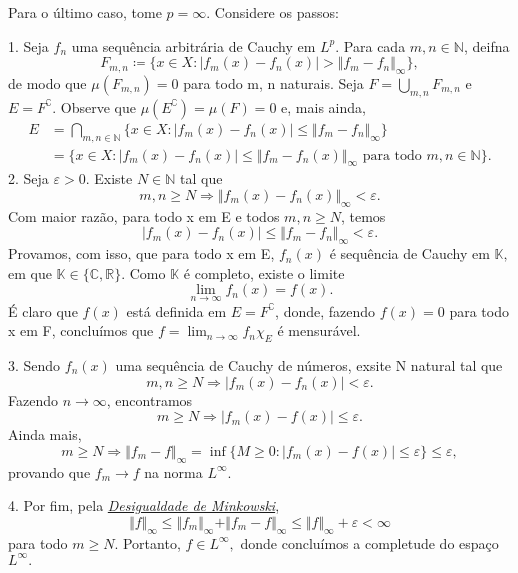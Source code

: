 \documentclass[measure_theory.tex]{subfiles}
\begin{document}
\begin{proof*}
	Para o último caso, tome \(p=\infty\). Considere os passos:

	1. Seja \(f_{n}\) uma sequência arbitrária de Cauchy em \(L^{p}.\) Para cada \(m, n\in \mathbb{N}\), deifna
	\[
		F_{m, n}\coloneqq \{x\in X: |f_{m}(x) - f_{n}(x)| > \Vert f_{m}-f_{n} \Vert_{\infty}\},
	\]
	de modo que \(\mu (F_{m, n})=0\) para todo m, n naturais. Seja \(F = \bigcup_{m, n}^{}F_{m, n}\) e \(E = F ^{\complement}\). Observe que \(\mu (E ^{\complement}) = \mu (F) = 0\) e, mais ainda,
	\begin{align*}
		E & =\bigcap_{m, n\in \mathbb{N}}^{}\{x\in X: |f_{m}(x) - f_{n}(x)| \leq \Vert f_{m}-f_{n} \Vert_{\infty}\}            \\
		  & =\{x\in X: |f_{m}(x) - f_{n}(x)| \leq \Vert f_{m} - f_{n}(x) \Vert_{\infty}\text{ para todo }m, n\in \mathbb{N}\}.
	\end{align*}
	2. Seja \(\varepsilon  > 0\). Existe \(N\in \mathbb{N}\) tal que
	\[
		m, n\geq N \Rightarrow \Vert f_{m}(x) - f_{n}(x) \Vert_{\infty} < \varepsilon .
	\]
	Com maior razão, para todo x em E e todos \(m, n\geq N\), temos
	\[
		|f_{m}(x) - f_{n}(x)|\leq \Vert f_{m} - f_{n} \Vert_{\infty} < \varepsilon .
	\]
	Provamos, com isso, que para todo x em E, \(f_{n}(x)\) é sequência de Cauchy em \(\mathbb{K},\) em que \(\mathbb{K}\in \{\mathbb{C}, \mathbb{R}\}\). Como \(\mathbb{K}\) é completo, existe o limite
	\[
		\lim_{n\to \infty}f_{n}(x) = f(x).
	\]
	É claro que \(f(x)\) está definida em \(E = F ^{\complement}\), donde, fazendo \(f(x) = 0\) para todo x em F, concluímos que \(f = \lim_{n\to \infty}f_{n}\chi_{E}\) é mensurável.

	3. Sendo \(f_{n}(x)\) uma sequência de Cauchy de números, exsite N natural tal que
	\[
		m, n \geq N \Rightarrow |f_{m}(x) - f_{n}(x)| < \varepsilon .
	\]
	Fazendo \(n\to \infty\), encontramos
	\[
		m\geq N \Rightarrow |f_{m}(x) - f(x)|\leq \varepsilon .
	\]
	Ainda mais,
	\[
		m\geq N \Rightarrow \Vert f_{m}-f \Vert_{\infty} = \inf_{}\{M\geq 0: |f_{m}(x) - f(x)|\leq \varepsilon \}\leq \varepsilon,
	\]
	provando que \(f_m\to f\) na norma \(L^{\infty}.\)

	4. Por fim, pela \hyperlink{minkowski}{\textit{Desigualdade de Minkowski}},
	\[
		\Vert f \Vert_{\infty}\leq \Vert f_{m} \Vert_{\infty} + \Vert f_m - f \Vert_{\infty}\leq \Vert f \Vert_{\infty} + \varepsilon  < \infty
	\]
	para todo \(m\geq N\). Portanto, \(f\in L^{\infty},\) donde concluímos a completude do espaço \(L^{\infty}.\) \qedsymbol

\end{proof*}
\end{document}
